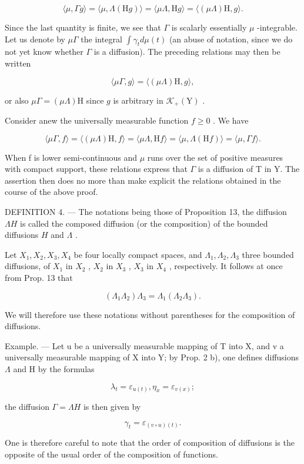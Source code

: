 \[
\langle \mu , \Gamma g \rangle = \langle \mu , \Lambda (\mathrm{H} g) \rangle = \langle \mu \Lambda , \mathrm{H} g \rangle = \langle (\mu \Lambda) \mathrm{H}, g \rangle .
\]

Since the last quantity is finite, we see that \(\Gamma\) is scalarly essentially \(\mu\) -integrable. Let us denote by \(\mu\Gamma\) the integral \(\int\gamma_{t}d\mu(t)\) (an abuse of notation, since we do not yet know whether \(\Gamma\) is a diffusion). The preceding relations may then be written

\[
\langle \mu \Gamma , g \rangle = \langle (\mu \Lambda) \mathrm{H}, g \rangle ,
\]

or also \(\mu \Gamma = (\mu \Lambda)\mathrm{H}\) since \(g\) is arbitrary in \(\mathcal{K}_+(\mathrm{Y})\) .

Consider anew the universally measurable function \(f \geqslant 0\) . We have

\[
\langle \mu \Gamma , f \rangle = \langle (\mu \Lambda) \mathrm{H}, f \rangle = \langle \mu \Lambda , \mathrm{H} f \rangle = \langle \mu , \Lambda (\mathrm{H} f) \rangle = \langle \mu , \Gamma f \rangle .
\]

When f is lower semi-continuous and \(\mu\) runs over the set of positive measures with compact support, these relations express that \(\Gamma\) is a diffusion of T in Y. The assertion then does no more than make explicit the relations obtained in the course of the above proof.

DEFINITION 4. --- The notations being those of Proposition 13, the diffusion \(\Lambda H\) is called the composed diffusion (or the composition) of the bounded diffusions \(H\) and \(\Lambda\) .

Let \(X_{1}, X_{2}, X_{3}, X_{4}\) be four locally compact spaces, and \(\Lambda_{1}, \Lambda_{2}, \Lambda_{3}\) three bounded diffusions, of \(X_{1}\) in \(X_{2}\) , \(X_{2}\) in \(X_{3}\) , \(X_{3}\) in \(X_{4}\) , respectively. It follows at once from Prop. 13 that

\[
(\Lambda_ {1} \Lambda_ {2}) \Lambda_ {3} = \Lambda_ {1} (\Lambda_ {2} \Lambda_ {3}).
\]

We will therefore use these notations without parentheses for the composition of diffusions.

Example. --- Let u be a universally measurable mapping of T into X, and v a universally measurable mapping of X into Y; by Prop. 2 b), one defines diffusions \(\Lambda\) and H by the formulas

\[
\lambda_ {t} = \varepsilon_ {u (t)}, \eta_ {x} = \varepsilon_ {v (x)};
\]

the diffusion \(\Gamma = \Lambda H\) is then given by

\[
\gamma_ {t} = \varepsilon_ {(v \circ u) (t)}.
\]

One is therefore careful to note that the order of composition of diffusions is the opposite of the usual order of the composition of functions.

